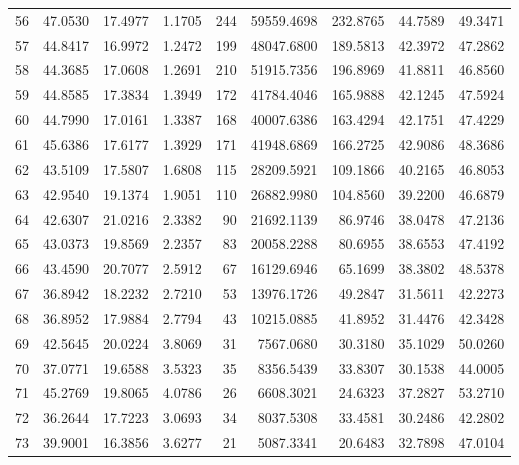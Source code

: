 \begin{longtable}{rrrrrrrrr}
56 & 47.0530 & 17.4977 & 1.1705 & 244 & 59559.4698 & 232.8765 & 44.7589 & 49.3471 \\
57 & 44.8417 & 16.9972 & 1.2472 & 199 & 48047.6800 & 189.5813 & 42.3972 & 47.2862 \\
58 & 44.3685 & 17.0608 & 1.2691 & 210 & 51915.7356 & 196.8969 & 41.8811 & 46.8560 \\
59 & 44.8585 & 17.3834 & 1.3949 & 172 & 41784.4046 & 165.9888 & 42.1245 & 47.5924 \\
60 & 44.7990 & 17.0161 & 1.3387 & 168 & 40007.6386 & 163.4294 & 42.1751 & 47.4229 \\
61 & 45.6386 & 17.6177 & 1.3929 & 171 & 41948.6869 & 166.2725 & 42.9086 & 48.3686 \\
62 & 43.5109 & 17.5807 & 1.6808 & 115 & 28209.5921 & 109.1866 & 40.2165 & 46.8053 \\
63 & 42.9540 & 19.1374 & 1.9051 & 110 & 26882.9980 & 104.8560 & 39.2200 & 46.6879 \\
64 & 42.6307 & 21.0216 & 2.3382 & 90 & 21692.1139 & 86.9746 & 38.0478 & 47.2136 \\
65 & 43.0373 & 19.8569 & 2.2357 & 83 & 20058.2288 & 80.6955 & 38.6553 & 47.4192 \\
66 & 43.4590 & 20.7077 & 2.5912 & 67 & 16129.6946 & 65.1699 & 38.3802 & 48.5378 \\
67 & 36.8942 & 18.2232 & 2.7210 & 53 & 13976.1726 & 49.2847 & 31.5611 & 42.2273 \\
68 & 36.8952 & 17.9884 & 2.7794 & 43 & 10215.0885 & 41.8952 & 31.4476 & 42.3428 \\
69 & 42.5645 & 20.0224 & 3.8069 & 31 & 7567.0680 & 30.3180 & 35.1029 & 50.0260 \\
70 & 37.0771 & 19.6588 & 3.5323 & 35 & 8356.5439 & 33.8307 & 30.1538 & 44.0005 \\
71 & 45.2769 & 19.8065 & 4.0786 & 26 & 6608.3021 & 24.6323 & 37.2827 & 53.2710 \\
72 & 36.2644 & 17.7223 & 3.0693 & 34 & 8037.5308 & 33.4581 & 30.2486 & 42.2802 \\
73 & 39.9001 & 16.3856 & 3.6277 & 21 & 5087.3341 & 20.6483 & 32.7898 & 47.0104 \\
\end{longtable}
